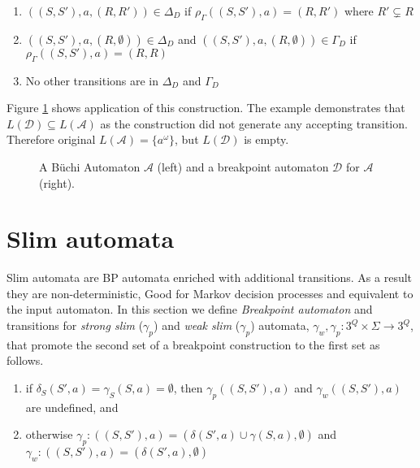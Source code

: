 \documentclass[
	digital
nolof, nolot
]{fithesis3}
\newcommand{\cA}{\mathcal{A}}
\newcommand{\cD}{\mathcal{D}}
\newcommand{\lA}{L(\cA)}
\newcommand{\lD}{L(\cD)}
\begin{document}
			\begin{enumerate}
				\item $((S, S'), a, (R, R')) \in \Delta_D$ if $\rho_\Gamma((S,S'),a)=(R,R')$ where $R' \subsetneq R$
				\item $((S, S'), a, (R, \emptyset)) \in \Delta_D$ and $((S, S'), a, (R, \emptyset)) \in \Gamma_D$ if $\rho_\Gamma((S,S'),a)=(R,R)$ 
				\item No other transitions are in $\Delta_D$ and $\Gamma_D$
			\end{enumerate}
			
			Figure \ref{fig:bp:non-equivalent} shows application of this construction. The example demonstrates that $\lD \subseteq \lA$ as the construction did not generate any accepting transition. Therefore original $\lA=\{a^\omega\}$, but $\lD$ is empty.
			
			
			
			\begin{figure}[ht]
				\begin{center}
					
					
				\end{center}
				\caption{A Büchi Automaton $\cA$ (left) and a breakpoint automaton $\cD$ for $\cA$ (right). }
				\label{fig:bp:non-equivalent}
			\end{figure}
		
			\section{Slim automata}
			Slim automata are BP automata enriched with additional transitions. As a result they are non-deterministic, Good for Markov decision processes \cite{hlavni} and equivalent to the input automaton.	
			In this section we define \emph{Breakpoint automaton} and transitions for \emph{strong slim} ($\gamma_{p}$) and \emph{weak slim} ($\gamma_{p}$) automata,
			 $\gamma_w, \gamma_p:3^Q \times \Sigma \rightarrow 3^Q$, that promote the second set of a breakpoint construction to the first set as follows. 
			
			\begin{enumerate}
				\item if $\delta_S(S',a) = \gamma_S(S, a) = \emptyset$, then $\gamma_{p}((S,S'), a)$ and $\gamma_{w}((S,S'), a)$ are undefined, and
				\item otherwise
				$\gamma_{p}:((S,S'),a)=(\delta(S',a)\cup\gamma(S, a),\emptyset)$ and $\gamma_{w}:((S,S'),a)=(\delta(S',a),\emptyset)$
			\end{enumerate}
			
\end{document}
